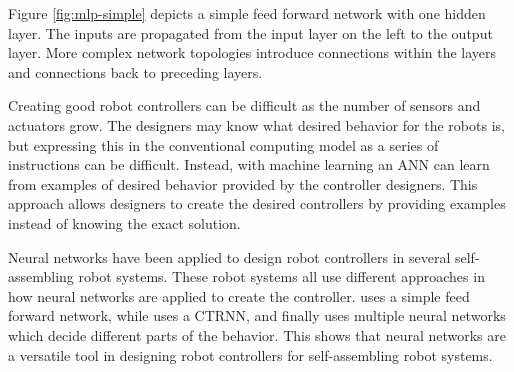 Figure \ref{fig:mlp-simple} depicts a simple feed forward network with one hidden layer.
The inputs are propagated from the input layer on the left to the output layer.
More complex network topologies introduce connections within the layers and connections back to preceding layers.

Creating good robot controllers can be difficult as the number of sensors and actuators grow.
The designers may know what desired behavior for the robots is, but expressing this in the conventional computing model as a series of instructions can be difficult.
Instead, with machine learning an ANN can learn from examples of desired behavior provided by the controller designers.
This approach allows designers to create the desired controllers by providing examples instead of knowing the exact solution.

Neural networks have been applied to design robot controllers in several\cite{trianni_evolving_2004, montanier_adaptive_2014, brandt_atron_2007} self-assembling robot systems.
These robot systems all use different approaches in how neural networks are applied to create the controller.
\cite{montanier_adaptive_2014} uses a simple feed forward network, while \cite{trianni_evolving_2004} uses a CTRNN, and finally \cite{brandt_atron_2007} uses multiple neural networks which decide different parts of the behavior.
This shows that neural networks are a versatile tool in designing robot controllers for self-assembling robot systems.

